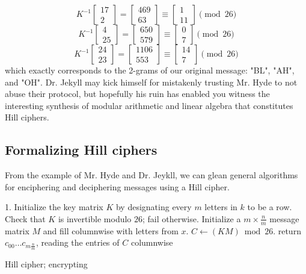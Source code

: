 \documentclass{paper}
\begin{document}
\[ K^{-1}\begin{bmatrix} 17 \\ 2 \end{bmatrix} = \begin{bmatrix} 469 \\ 63 \end{bmatrix} \equiv \begin{bmatrix} 1 \\ 11 \end{bmatrix} \pmod{26} \]
\[ K^{-1}\begin{bmatrix} 4 \\ 25 \end{bmatrix} = \begin{bmatrix} 650 \\ 579 \end{bmatrix} \equiv \begin{bmatrix} 0 \\ 7 \end{bmatrix} \pmod{26} \]
\[ K^{-1}\begin{bmatrix} 24 \\ 23 \end{bmatrix} = \begin{bmatrix} 1106 \\ 553 \end{bmatrix} \equiv \begin{bmatrix} 14 \\ 7 \end{bmatrix} \pmod{26} \]
which exactly corresponds to the 2-grams of our original message: "BL", "AH", and "OH". Dr. Jekyll may kick himself for mistakenly trusting Mr. Hyde to not abuse their protocol, but hopefully his ruin has enabled you witness the interesting synthesis of modular arithmetic and linear algebra that constitutes Hill ciphers.

\subsection{Formalizing Hill ciphers}

From the example of Mr. Hyde and Dr. Jeykll, we can glean general algorithms for enciphering and deciphering messages using a Hill cipher.

\begin{algorithm}
    \SetAlgoLined
    1. Initialize the key matrix $K$ by designating every $m$ letters in $k$ to be a row. Check that $K$ is invertible modulo $26$; fail otherwise. Initialize a $m \times \frac{n}{m}$ message matrix $M$ and fill columnwise with letters from $x$. $C \gets (KM) \bmod 26$. return $c_{00} \dots c_{m\frac{n}{m}}$, reading the entries of $C$ columnwise\;
    \caption{Hill cipher; encrypting}
\end{algorithm}
\end{document}

